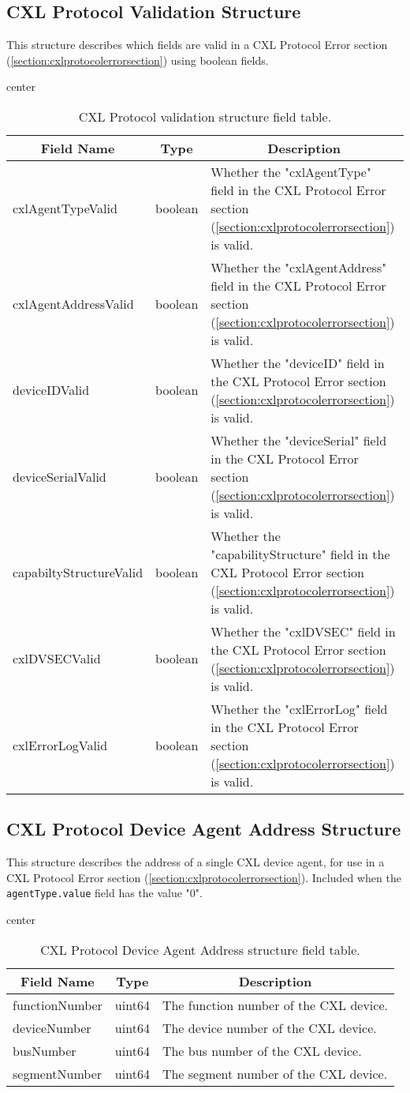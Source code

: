 \documentclass{report}
\newcommand*{\thead}[1]{\multicolumn{1}{|c|}{\bfseries #1}}
\newcommand*{\jsontable}[1]{
    \begin{table}[!ht]
    \label{#1}
    \centering
    \begin{adjustbox}{center}
    \begin{tabular}{|l|c|p{8cm}|}
    \hline
    \thead{Field Name} & \thead{Type} & \thead{Description} \\
    \hline
}
\newcommand*{\jsontableend}[1]{
    \hline
    \end{tabular}
    \end{adjustbox}
    \caption{#1}
    \label{table:#1}
    \end{table}
    \FloatBarrier
}
\begin{document}
\subsection{CXL Protocol Validation Structure}
\label{subsection:cxlprotocolvalidationstructure}
This structure describes which fields are valid in a CXL Protocol Error section (\ref{section:cxlprotocolerrorsection}) using boolean fields.
\jsontable{table:cxlprotocolvalidationstructure}
cxlAgentTypeValid & boolean & Whether the "cxlAgentType" field in the CXL Protocol Error section (\ref{section:cxlprotocolerrorsection}) is valid.\\
\hline
cxlAgentAddressValid & boolean & Whether the "cxlAgentAddress" field in the CXL Protocol Error section (\ref{section:cxlprotocolerrorsection}) is valid.\\
\hline
deviceIDValid & boolean & Whether the "deviceID" field in the CXL Protocol Error section (\ref{section:cxlprotocolerrorsection}) is valid.\\
\hline
deviceSerialValid & boolean & Whether the "deviceSerial" field in the CXL Protocol Error section (\ref{section:cxlprotocolerrorsection}) is valid.\\
\hline
capabiltyStructureValid & boolean & Whether the "capabilityStructure" field in the CXL Protocol Error section (\ref{section:cxlprotocolerrorsection}) is valid.\\
\hline
cxlDVSECValid & boolean & Whether the "cxlDVSEC" field in the CXL Protocol Error section (\ref{section:cxlprotocolerrorsection}) is valid.\\
\hline
cxlErrorLogValid & boolean & Whether the "cxlErrorLog" field in the CXL Protocol Error section (\ref{section:cxlprotocolerrorsection}) is valid.\\
\jsontableend{CXL Protocol validation structure field table.}

\subsection{CXL Protocol Device Agent Address Structure}
\label{subsection:cxlprotocoldeviceagentaddressstructure}
This structure describes the address of a single CXL device agent, for use in a CXL Protocol Error section (\ref{section:cxlprotocolerrorsection}). Included when the \texttt{agentType.value} field has the value "0".
\jsontable{table:cxlprotocoldeviceagentaddressstructure}
functionNumber & uint64 & The function number of the CXL device.\\
\hline
deviceNumber & uint64 & The device number of the CXL device.\\
\hline
busNumber & uint64 & The bus number of the CXL device.\\
\hline
segmentNumber & uint64 & The segment number of the CXL device.\\
\jsontableend{CXL Protocol Device Agent Address structure field table.}
\end{document}
